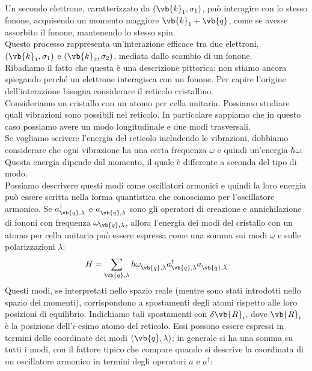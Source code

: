 Un secondo elettrone, caratterizzato da $(\vb{k}_1,\sigma_1)$, può interagire con lo stesso fonone, acquisendo un momento maggiore $\vb{k}_1 + \vb{q}$, come se avesse assorbito il fonone, mantenendo lo stesso spin.\\
Questo processo rappresenta un'interazione efficace tra due elettroni, $(\vb{k}_1,\sigma_1)$ e $(\vb{k}_2,\sigma_2)$, mediata dallo scambio di un fonone.\\
Ribadiamo il fatto che questa è una descrizione pittorica: non stiamo ancora spiegando perché un elettrone interagisca con un fonone. Per capire l'origine dell'interazione bisogna considerare il reticolo cristallino.\\
Consideriamo un cristallo con un atomo per cella unitaria. Possiamo studiare quali vibrazioni sono possibili nel reticolo. In particolare sappiamo che in questo caso possiamo avere un modo longitudinale e due modi trasversali.\\
Se vogliamo scrivere l'energia del reticolo includendo le vibrazioni, dobbiamo considerare che ogni vibrazione ha una certa frequenza $\omega$ e quindi un'energia $\hbar\omega$. Questa energia dipende dal momento, il quale è differente a seconda del tipo di modo.\\
Possiamo descrivere questi modi come oscillatori armonici e quindi la loro energia può essere scritta nella forma quantistica che conosciamo per l'oscillatore armonico. Se $a^{\dag}_{\vb{q},\lambda}$ e $a^{\vphantom{\dag}}_{\vb{q},\lambda}$ sono gli operatori di creazione e annichilazione di fononi con frequenza $\omega_{\vb{q},\lambda}$, allora l'energia dei modi del cristallo con un atomo per cella unitaria può essere espressa come una somma sui modi $\omega$ e sulle polarizzazioni $\lambda$:
\begin{equation*}
   H
   = \sum_{\vb{q},\lambda} \hbar \omega^{\vphantom{\dag}}_{\vb{q},\lambda} a_{\vb{q},\lambda}^{\dag} a^{\vphantom{\dag}}_{\vb{q},\lambda}
\end{equation*}
Questi modi, se interpretati nello spazio reale (mentre sono stati introdotti nello spazio dei momenti), corrispondono a spostamenti degli atomi rispetto alle loro posizioni di equilibrio. Indichiamo tali spostamenti con $\delta \vb{R}_i$, dove $\vb{R}_i$ è la posizione dell'$i$-esimo atomo del reticolo. Essi possono essere espressi in termini delle coordinate dei modi $(\vb{q},\lambda)$; in generale si ha una somma su tutti i modi, con il fattore tipico che compare quando si descrive la coordinata di un oscillatore armonico in termini degli operatori $a$ e $a^{\dag}$:
